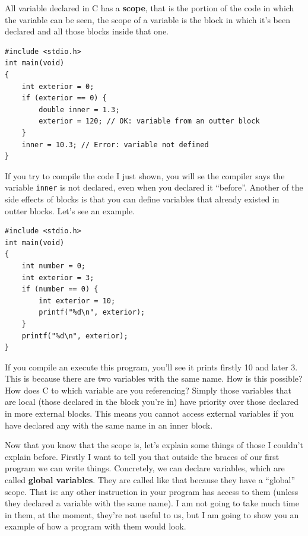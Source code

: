\documentclass[a4paper]{article}
\begin{document}
All variable declared in C has a \textbf{scope}, that is the portion of the code
in which the variable can be seen, the scope of a variable is the block in which
it's been declared and all those blocks inside that one.

\noindent
\begin{minipage}[H]{\linewidth}
\mbox{}
\begin{lstlisting}[style=C,
caption={Example of scope of declared variables},
label={lst:scopeVar}]
#include <stdio.h>
int main(void)
{
    int exterior = 0;
    if (exterior == 0) {
        double inner = 1.3;
        exterior = 120; // OK: variable from an outter block
    }
    inner = 10.3; // Error: variable not defined
}
\end{lstlisting}
\end{minipage}

If you try to compile the code I just shown, you will se the compiler says the
variable \texttt{inner} is not declared, even when you declared it ``before''.
Another of the side effects of blocks is that you can define variables that
already existed in outter blocks. Let's see an example.

\noindent
\begin{minipage}[H]{\linewidth}
\mbox{}
\begin{lstlisting}[style=C,
caption={Example of redefinition of variable},
label={lst:varRedefinition}]
#include <stdio.h>
int main(void)
{
    int number = 0;
    int exterior = 3;
    if (number == 0) {
        int exterior = 10;
        printf("%d\n", exterior);
    }
    printf("%d\n", exterior);
}
\end{lstlisting}
\end{minipage}

If you compile an execute this program, you'll see it prints firstly 10 and
later 3. This is because there are two variables with the same name. How is this
possible? How does C to which variable are you referencing? Simply those
variables that are local (those declared in the block you're in) have priority
over those declared in more external blocks. This means you cannot access
external variables if you have declared any with the same name in an inner
block.

Now that you know that the scope is, let's explain some things of those I
couldn't explain before. Firstly I want to tell you that outside the braces of
our first program we can write things. Concretely, we can declare variables,
which are called \textbf{global variables}. They are called like that because
they have a ``global'' scope. That is: any other instruction in your program
has access to them (unless they declared a variable with the same name). I am
not going to take much time in them, at the moment, they're not useful to us,
but I am going to show you an example of how a program with them would look.
\end{document}
